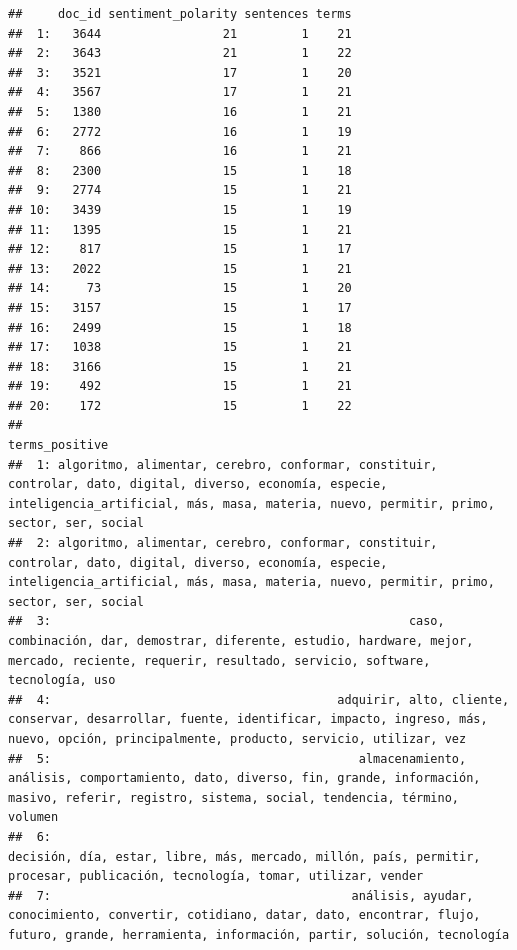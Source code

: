 \documentclass[
]{book}
\begin{document}
\begin{verbatim}
##     doc_id sentiment_polarity sentences terms
##  1:   3644                 21         1    21
##  2:   3643                 21         1    22
##  3:   3521                 17         1    20
##  4:   3567                 17         1    21
##  5:   1380                 16         1    21
##  6:   2772                 16         1    19
##  7:    866                 16         1    21
##  8:   2300                 15         1    18
##  9:   2774                 15         1    21
## 10:   3439                 15         1    19
## 11:   1395                 15         1    21
## 12:    817                 15         1    17
## 13:   2022                 15         1    21
## 14:     73                 15         1    20
## 15:   3157                 15         1    17
## 16:   2499                 15         1    18
## 17:   1038                 15         1    21
## 18:   3166                 15         1    21
## 19:    492                 15         1    21
## 20:    172                 15         1    22
##                                                                                                                                                                                           terms_positive
##  1: algoritmo, alimentar, cerebro, conformar, constituir, controlar, dato, digital, diverso, economía, especie, inteligencia_artificial, más, masa, materia, nuevo, permitir, primo, sector, ser, social
##  2: algoritmo, alimentar, cerebro, conformar, constituir, controlar, dato, digital, diverso, economía, especie, inteligencia_artificial, más, masa, materia, nuevo, permitir, primo, sector, ser, social
##  3:                                                  caso, combinación, dar, demostrar, diferente, estudio, hardware, mejor, mercado, reciente, requerir, resultado, servicio, software, tecnología, uso
##  4:                                        adquirir, alto, cliente, conservar, desarrollar, fuente, identificar, impacto, ingreso, más, nuevo, opción, principalmente, producto, servicio, utilizar, vez
##  5:                                           almacenamiento, análisis, comportamiento, dato, diverso, fin, grande, información, masivo, referir, registro, sistema, social, tendencia, término, volumen
##  6:                                                                        decisión, día, estar, libre, más, mercado, millón, país, permitir, procesar, publicación, tecnología, tomar, utilizar, vender
##  7:                                          análisis, ayudar, conocimiento, convertir, cotidiano, datar, dato, encontrar, flujo, futuro, grande, herramienta, información, partir, solución, tecnología

\end{verbatim}
\end{document}
